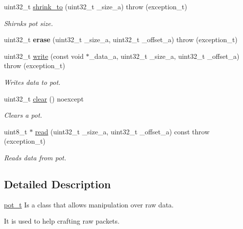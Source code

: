 \begin{DoxyCompactItemize}
uint32\+\_\+t \hyperlink{class_n_h_1_1_protocols_1_1_raw_1_1pot__t_ab4fc8a6029016155ae39df75b8dbcdf8}{shrink\+\_\+to} (uint32\+\_\+t \+\_\+size\+\_\+a)  throw (exception\+\_\+t)
\begin{DoxyCompactList}\small\item\em Shirnks pot size. \end{DoxyCompactList}\item 
\hypertarget{class_n_h_1_1_protocols_1_1_raw_1_1pot__t_a5d0b2593be5dd30b2e58559689adfd16}{uint32\+\_\+t {\bfseries erase} (uint32\+\_\+t \+\_\+size\+\_\+a, uint32\+\_\+t \+\_\+offset\+\_\+a)  throw (exception\+\_\+t)}\label{class_n_h_1_1_protocols_1_1_raw_1_1pot__t_a5d0b2593be5dd30b2e58559689adfd16}

\item 
uint32\+\_\+t \hyperlink{class_n_h_1_1_protocols_1_1_raw_1_1pot__t_a4068d39eb11d3c2d670b33e00915cc77}{write} (const void $\ast$\+\_\+data\+\_\+a, uint32\+\_\+t \+\_\+size\+\_\+a, uint32\+\_\+t \+\_\+offset\+\_\+a)  throw (exception\+\_\+t)
\begin{DoxyCompactList}\small\item\em Writes data to pot. \end{DoxyCompactList}\item 
uint32\+\_\+t \hyperlink{class_n_h_1_1_protocols_1_1_raw_1_1pot__t_a42ef9135f8aaf966567fcd5ae71a8671}{clear} () noexcept
\begin{DoxyCompactList}\small\item\em Clears a pot. \end{DoxyCompactList}\item 
uint8\+\_\+t $\ast$ \hyperlink{class_n_h_1_1_protocols_1_1_raw_1_1pot__t_a2f5e6d1d71b570f27fc92fb4387ff2d9}{read} (uint32\+\_\+t \+\_\+size\+\_\+a, uint32\+\_\+t \+\_\+offset\+\_\+a) const   throw (exception\+\_\+t)
\begin{DoxyCompactList}\small\item\em Reads data from pot. \end{DoxyCompactList}\end{DoxyCompactItemize}


\subsection{Detailed Description}
\hyperlink{class_n_h_1_1_protocols_1_1_raw_1_1pot__t}{pot\+\_\+t} Is a class that allows manipulation over raw data. 

It is used to help crafting raw packets. 

